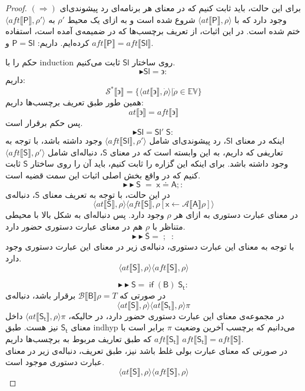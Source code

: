 \begin{proof}
	$(\Rightarrow)$
	برای این حالت، باید ثابت کنیم که در معنای هر برنامه‌ای رد پیشوندی‌ای وجود دارد که با
	$\langle at\llbracket \mathsf{P} \rrbracket , \rho \rangle$
	شروع شده است و به ازای یک محیط $\rho'$ به 
	$\langle aft\llbracket \mathsf{P} \rrbracket , \rho' \rangle$
	ختم شده است. 
	در این اثبات، از تعریف برچسب‌ها که در ضمیمه‌ی \cite{calcul} آمده است، استفاده کرده‌ایم.
	داریم:
	$\mathsf{P=Sl}$
	و 
	$aft \llbracket \mathsf{P} \rrbracket = aft \llbracket \mathsf{Sl} \rrbracket $.
	
	حکم را با \gls*{induction} روی ساختار $\mathsf{Sl}$ ثابت می‌کنیم. 
	$$\blacktriangleright \mathsf{Sl = \backepsilon}:$$
	داریم:
	$$\mathcal{S^*} \llbracket \backepsilon \rrbracket = \{\langle at \llbracket \backepsilon \rrbracket , \dot{\rho} \rangle | \dot{\rho} \in \mathbb{EV}\}$$
	همین طور طبق تعریف برچسب‌ها داریم:
	$$at \llbracket \backepsilon \rrbracket = aft \llbracket \backepsilon \rrbracket$$
	پس حکم برقرار است.
	$$\blacktriangleright \mathsf{Sl =Sl'\;S}:$$
	اینکه در معنای $\mathsf{Sl}$، رد پیشوندی‌ای شامل
	 $\langle aft \llbracket \mathsf{Sl} \rrbracket , \rho '\rangle$ وجود داشته باشد، با توجه به تعاریفی که داریم، به این وابسته است که در معنای
	  $\mathsf{S}$،
	   دنباله‌ای شامل $\langle aft \llbracket \mathsf{S} \rrbracket , \rho' \rangle$ وجود داشته باشد. برای اینکه این گزاره را ثابت کنیم، باید آن را روی ساختار $\mathsf{S}$ ثابت کنیم که در واقع بخش اصلی اثبات این سمت قضیه است. 
	$$\blacktriangleright\blacktriangleright \mathsf{S\;=\; x\doteq A;}:$$
	در این حالت، با توجه به تعریف معنای $\mathsf{S}$، دنباله‌ی 
	$$\langle at \llbracket \mathsf{S} \rrbracket ,\rho \rangle \langle aft\llbracket\mathsf{S}\rrbracket , \rho[\mathsf{x}\leftarrow \mathcal{A}\llbracket\mathsf{A}\rrbracket\rho] \rangle $$
	در معنای عبارت‌ دستوری به ازای هر $\rho$ وجود دارد. پس دنباله‌ای به شکل بالا با محیطی متناظر با
	$\underline{\rho}$
	هم در معنای عبارت‌ دستوری حضور دارد.
	$$\blacktriangleright\blacktriangleright \mathsf{S=\; ; \;\;}:$$	 
با توجه به معنای این عبارت‌ دستوری، دنباله‌ی زیر در معنای این عبارت‌ دستوری وجود دارد.
$$\langle at \llbracket \mathsf{S} \rrbracket ,\rho \rangle \langle aft\llbracket\mathsf{S}\rrbracket , \rho \rangle $$

$$\blacktriangleright\blacktriangleright \mathsf{S=\; if\;(B)\;S_t}:$$
	در صورتی که 
	$\mathcal{B}\llbracket\mathsf{B}\rrbracket\rho=\mathit{T}$
	برقرار باشد، دنباله‌ی 
	$$\langle at \llbracket \mathsf{S} \rrbracket , \rho \rangle
	\langle at \llbracket \mathsf{S_t} \rrbracket , \rho \rangle \pi$$
	در مجموعه‌ی معنای این عبارت‌ دستوری حضور دارد، در حالیکه، 
	$\langle at \llbracket \mathsf{S_t} \rrbracket , \rho \rangle \pi$
	داخل معنای $\mathsf{S_t}$ نیز هست. طبق \gls*{indhyp} می‌دانیم که برچسب آخرین وضعیت $\pi$ برابر است با $aft \llbracket \mathsf{S_t} \rrbracket$ که طبق تعاریف مربوط به برچسب‌ها داریم
	$aft \llbracket \mathsf{S_t} \rrbracket=aft \llbracket \mathsf{S} \rrbracket$.\\
	در صورتی که معنای عبارت بولی غلط باشد نیز، طبق تعریف، دنباله‌ی زیر در معنای عبارت‌ دستوری موجود است.
	$$\langle at \llbracket \mathsf{S} \rrbracket ,\rho \rangle \langle aft\llbracket\mathsf{S}\rrbracket , \rho \rangle $$
	

\end{proof}
